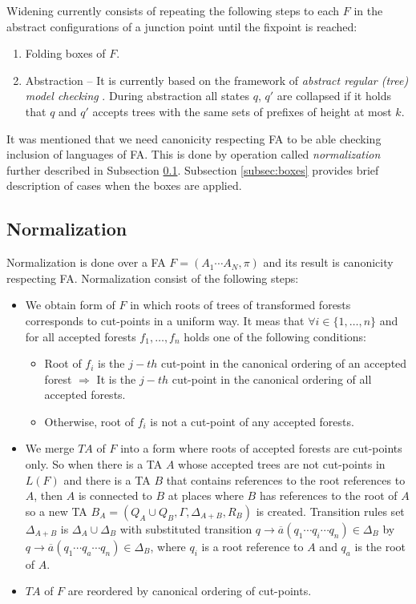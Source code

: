 Widening currently consists of repeating the following steps to each $F$ in the abstract configurations of a junction point until the fixpoint is reached:
\begin{enumerate}
		\item Folding boxes of $F$.
		\item Abstraction -- It is currently based on the framework of \emph{abstract regular (tree) model checking} \cite{artmc}.
			During abstraction all states $q$, $q'$ are collapsed if it holds that
			$q$ and $q'$ accepts trees with the same sets of prefixes of height at most $k$.
\end{enumerate}

It was mentioned that we need canonicity respecting FA to be able checking inclusion of languages of FA.
This is done by operation called \emph{normalization} further described in Subsection \ref{subsec:norm}.
Subsection \ref{subsec:boxes} provides brief description of cases when the boxes are applied.

\subsection{Normalization}
\label{subsec:norm}

Normalization is done over a FA $F = (A_1 \cdots A_N,\pi)$ and its result is canonicity respecting FA.
Normalization consist of the following steps:
\begin{itemize}
		\item We obtain form of $F$ in which roots of trees of transformed forests corresponds to
			cut-points in a uniform way.
			It meas that $\forall i \in \{1,\ldots,n\}$ and for all accepted forests $f_1,\ldots,f_n$ holds
			one of the following conditions:
			\begin{itemize}
				\item Root of $f_i$ is the $j-th$ cut-point in the canonical ordering of an accepted forest $\Rightarrow$
					It is the $j-th$ cut-point in the canonical ordering of all accepted forests.
				\item Otherwise, root of $f_i$ is not a cut-point of any accepted forests.
			\end{itemize}
		\item We merge $TA$ of $F$ into a form where roots of accepted forests are cut-points only.
			So when there is a TA $A$ whose accepted trees are not cut-points in $L(F)$ and there is
			a TA $B$ that contains references to the root references to $A$, then $A$ is connected
			to $B$ at places where $B$ has references to the root of $A$ so a new
			TA $B_A = (Q_A \cup Q_B, \Gamma, \Delta_{A+B}, R_B)$ is created.
			Transition rules set $\Delta_{A+B}$ is $\Delta_A \cup \Delta_B$ with substituted transition $q \rightarrow  \overline{a} (q_1 \cdots q_i \cdots q_n) \in \Delta_B$
			by $q \rightarrow  \overline{a} (q_1 \cdots q_a \cdots q_n) \in \Delta_B$, where $q_i$ is a root reference to $A$ and $q_a$ is the root of $A$. 
		\item $TA$ of $F$ are reordered by canonical ordering of cut-points.
\end{itemize}

